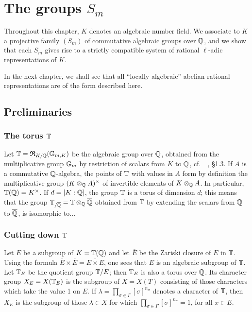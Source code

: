 \chapter{The groups \texorpdfstring{$S_m$}{Sm}}

Throughout this chapter,
\dpage
$K$ denotes an algebraic number field.
We associate to $K$ a projective family $(S_m)$ of commutative 
algebraic groups over $\mathbb{Q}$, and we show that each $S_m$ gives rise to a
strictly compatible system of rational $\ell$-adic representations of $K$.

In the next chapter, we shall see that all ``locally algebraic''
abelian rational representations are of the form described here.

\section{Preliminaries}

\subsection{The torus $\mathbb{T}$}
Let $\mathbb{T} = \operatorname{\mathfrak{R}}_{K/\mathbb{Q}}(\mathbb{G}_{m, K})$ be the algebraic group over $\mathbb{Q}$, obtained
from the multiplicative group $\mathbb{G}_m$ by restriction of scalars from $K$ to
$\mathbb{Q}$, cf.\ \citeauthor{43}~\cite{43}, \S 1.3. If $A$ is a commutative
$\mathbb{Q}$-algebra, the points of $\mathbb{T}$ with values in $A$ form by definition the
multiplicative group $(K \otimes_{\mathbb{Q}} A)^\times$ of invertible elements of $K
\otimes_{\mathbb{Q}} A$.
In particular, $\mathbb{T}(\mathbb{Q}) = K^\times$. If $d = [K : \mathbb{Q}]$, the group $\mathbb{T}$ is a
torus of dimension $d$; this means that the group $\mathbb{T}_{/\overline{\mathbb{Q}}} = \mathbb{T}
\otimes_{\mathbb{Q}} \overline{\mathbb{Q}}$ obtained from $\mathbb{T}$ by extending the scalars from $\mathbb{Q}$ to
$\overline{\mathbb{Q}}$, is isomorphic
\dpage
to...

\subsection{Cutting down $\mathbb{T}$}
Let $E$ be a subgroup of $K = \mathbb{T}(\mathbb{Q})$ and let $\overline{E}$ be the Zariski
closure of $E$ in $\mathbb{T}$. Using the formula $\overline{E} \times \overline{E} =
\overline{E \times E}$, one sees that $E$ is an algebraic subgroup of $\mathbb{T}$.
Let $\mathbb{T}_E$ be the quotient group $\mathbb{T}/E$; then $\mathbb{T}_E$ is also a torus over
$\mathbb{Q}$. Its character group $X_E = X(\mathbb{T}_E)$ is the subgroup of $X = X(T)$
consisting of those characters which take the value 1 on $E$.
If $\lambda = \prod_{\sigma \in \Gamma} [\sigma]^{n_\sigma}$ denotes a
character of $\mathbb{T}$, then $X_E$ is the subgroup of those $\lambda \in X$ for which
$\prod_{\sigma \in \Gamma} [\sigma]^{n_\sigma} = 1$, for all $x \in E$.

